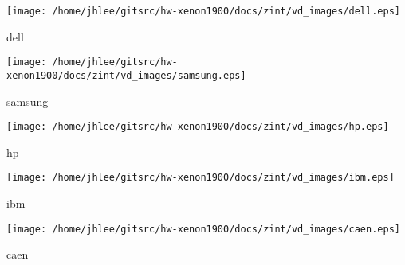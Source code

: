 \noindent
\vspace{1.4cm}
\begin{minipage}{.2\textwidth}
\begin{center}
\texttt{[image: /home/jhlee/gitsrc/hw-xenon1900/docs/zint/vd\_images/dell.eps]}
\end{center}
\end{minipage}
\begin{minipage}{.7\textwidth}
dell
\end{minipage}


\noindent
\vspace{1.4cm}
\begin{minipage}{.2\textwidth}
\begin{center}
\texttt{[image: /home/jhlee/gitsrc/hw-xenon1900/docs/zint/vd\_images/samsung.eps]}
\end{center}
\end{minipage}
\begin{minipage}{.7\textwidth}
samsung
\end{minipage}


\noindent
\vspace{1.4cm}
\begin{minipage}{.2\textwidth}
\begin{center}
\texttt{[image: /home/jhlee/gitsrc/hw-xenon1900/docs/zint/vd\_images/hp.eps]}
\end{center}
\end{minipage}
\begin{minipage}{.7\textwidth}
hp
\end{minipage}


\noindent
\vspace{1.4cm}
\begin{minipage}{.2\textwidth}
\begin{center}
\texttt{[image: /home/jhlee/gitsrc/hw-xenon1900/docs/zint/vd\_images/ibm.eps]}
\end{center}
\end{minipage}
\begin{minipage}{.7\textwidth}
ibm
\end{minipage}


\noindent
\vspace{1.4cm}
\begin{minipage}{.2\textwidth}
\begin{center}
\texttt{[image: /home/jhlee/gitsrc/hw-xenon1900/docs/zint/vd\_images/caen.eps]}
\end{center}
\end{minipage}
\begin{minipage}{.7\textwidth}
caen
\end{minipage}



